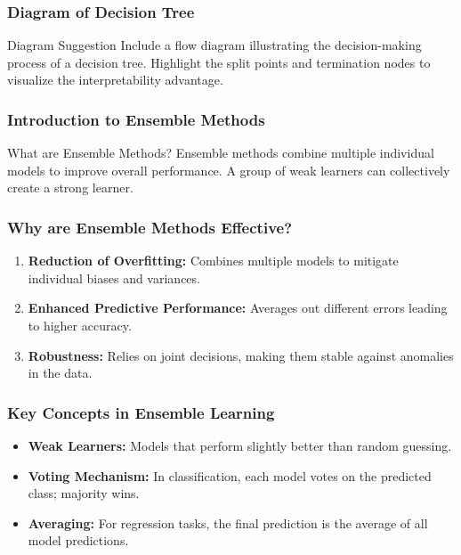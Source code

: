 \documentclass[aspectratio=169]{beamer}
\begin{document}
\begin{frame}[fragile]
    \frametitle{Diagram of Decision Tree}
    \begin{block}{Diagram Suggestion}
        Include a flow diagram illustrating the decision-making process of a decision tree. Highlight the split points and termination nodes to visualize the interpretability advantage.
    \end{block}
\end{frame}

\begin{frame}[fragile]
    \frametitle{Introduction to Ensemble Methods}
    \begin{block}{What are Ensemble Methods?}
        Ensemble methods combine multiple individual models to improve overall performance. 
        A group of weak learners can collectively create a strong learner.
    \end{block}
\end{frame}

\begin{frame}[fragile]
    \frametitle{Why are Ensemble Methods Effective?}
    \begin{enumerate}
        \item \textbf{Reduction of Overfitting:} Combines multiple models to mitigate individual biases and variances.
        \item \textbf{Enhanced Predictive Performance:} Averages out different errors leading to higher accuracy.
        \item \textbf{Robustness:} Relies on joint decisions, making them stable against anomalies in the data.
    \end{enumerate}
\end{frame}

\begin{frame}[fragile]
    \frametitle{Key Concepts in Ensemble Learning}
    \begin{itemize}
        \item \textbf{Weak Learners:} Models that perform slightly better than random guessing.
        \item \textbf{Voting Mechanism:} In classification, each model votes on the predicted class; majority wins.
        \item \textbf{Averaging:} For regression tasks, the final prediction is the average of all model predictions.
    \end{itemize}
\end{frame}
\end{document}
